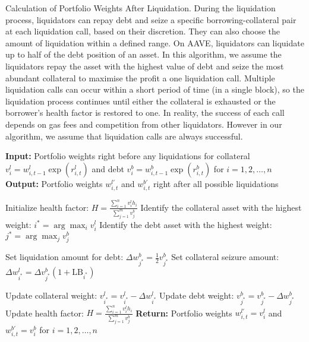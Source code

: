 \documentclass{article} %
\theoremstyle{plain}
\theoremstyle{definition} %
\begin{document}
\begin{algorithm}[t]
  \caption{Calculation of Portfolio Weights After Liquidation. 
  During the liquidation process, 
  liquidators can repay debt and seize a specific borrowing-collateral pair at each liquidation call, based on their discretion. 
  They can also choose the amount of liquidation within a defined range. 
  On AAVE, liquidators can liquidate up to half of the debt position of an asset.
  In this algorithm, we assume the liquidators repay the asset with the highest value of debt and seize the most abundant collateral to maximise the profit a one liquidation call.
  Multiple liquidation calls can occur within a short period of time (in a single block), so 
  the liquidation process continues until either the collateral is exhausted or the borrower's health factor is restored to one.
  In reality, the success of each call depends on gas fees and competition from other liquidators. 
  However in our algorithm, we assume that liquidation calls are always successful. }
  \label{alg:liquidation_weights}
  \begin{algorithmic}[1]
  \STATE \textbf{Input:} Portfolio weights right before any liquidations for collateral $v^l_i=w^l_{i,t-1}\exp(r^l_{i, t})$ and debt $v^b_i=w^b_{i,t-1}\exp(r^b_{i, t})$ for $i=1,2,\dots,n$
  \STATE \textbf{Output:} Portfolio weights $w^{l'}_{i,t}$ and $w^{b'}_{i,t}$ right after all possible liquidations
  
  \STATE Initialize health factor: $H = \frac{\sum_{i=1}^{n} v^l_ih_i}{\sum_{j=1}^{m} v^b_j}$
      \STATE Identify the collateral asset with the highest weight: $i^* = \arg\max_i v^l_i$
      \STATE Identify the debt asset with the highest weight: $j^* = \arg\max_j v^b_j$

      \STATE Set liquidation amount for debt: $\Delta w^b_{j^*} = \frac{1}{2} v^b_{j^*}$
      \STATE Set collateral seizure amount: $\Delta w^l_{i^*} = \Delta v^b_{j^*} (1 + \text{LB}_{i^*})$
      
      \STATE Update collateral weight: $v^{l}_{i^*} = v^l_{i^*} - \Delta w^l_{i^*}$
      \STATE Update debt weight: $v^{b}_{j^*} = v^b_{j^*} - \Delta w^b_{j^*}$
      \STATE Update health factor: $H = \frac{\sum_{i=1}^{n} v^{l}_i h_i}{\sum_{j=1}^{m} v^{b}_j}$
  \ENDWHILE
  \STATE \textbf{Return:} Portfolio weights $w^{l'}_{i,t}=v^{l}_i$ and $w^{b'}_{i,t}=v^{b}_i$ for $i=1,2,\dots,n$
  \end{algorithmic}
  \end{algorithm}
\end{document}
